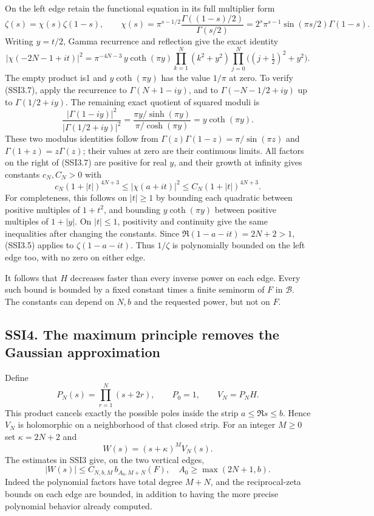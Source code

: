 On the left edge retain the functional equation in its full multiplier
form \[
\zeta(s)=\chi(s)\zeta(1-s),\qquad
\chi(s)=\pi^{s-1/2}\frac{\Gamma((1-s)/2)}{\Gamma(s/2)}
=2^s\pi^{s-1}\sin(\pi s/2)\Gamma(1-s).
\tag{SSI3.6}
\] Writing \(y=t/2\), Gamma recurrence and reflection give the exact
identity \[
|\chi(-2N-1+it)|^2=
\pi^{-4N-3}\,y\coth(\pi y)
 \prod_{k=1}^{N}(k^2+y^2)
 \prod_{j=0}^{N}\big((j+\tfrac12)^2+y^2\big).
\tag{SSI3.7}
\] The empty product is1 and \(y\coth(\pi y)\) has the value \(1/\pi\)
at zero. To verify (SSI3.7), apply the recurrence to \(\Gamma(N+1-iy)\),
and to \(\Gamma(-N-1/2+iy)\) up to \(\Gamma(1/2+iy)\). The remaining
exact quotient of squared moduli is \[
\frac{|\Gamma(1-iy)|^2}{|\Gamma(1/2+iy)|^2}
=\frac{\pi y/\sinh(\pi y)}{\pi/\cosh(\pi y)}
=y\coth(\pi y).
\tag{SSI3.8}
\] These two modulus identities follow from
\(\Gamma(z)\Gamma(1-z)=\pi/\sin(\pi z)\) and \(\Gamma(1+z)=z\Gamma(z)\);
their values at zero are their continuous limits. All factors on the
right of (SSI3.7) are positive for real \(y\), and their growth at
infinity gives constants \(c_N,C_N>0\) with \[
c_N(1+|t|)^{4N+3}\le |\chi(a+it)|^2
 \le C_N(1+|t|)^{4N+3}.
\tag{SSI3.9}
\] For completeness, this follows on \(|t|\ge1\) by bounding each
quadratic between positive multiples of \(1+t^2\), and bounding
\(y\coth(\pi y)\) between positive multiples of \(1+|y|\). On
\(|t|\le1\), positivity and continuity give the same inequalities after
changing the constants. Since \(\Re(1-a-it)=2N+2>1\), (SSI3.5) applies
to \(\zeta(1-a-it)\). Thus \(1/\zeta\) is polynomially bounded on the
left edge too, with no zero on either edge.

It follows that \(H\) decreases faster than every inverse power on each
edge. Every such bound is bounded by a fixed constant times a finite
seminorm of \(F\) in \(\mathcal B\). The constants can depend on \(N,b\)
and the requested power, but not on \(F\).

\subsection{SSI4. The maximum principle removes the Gaussian
approximation}\label{ssi4.-the-maximum-principle-removes-the-gaussian-approximation}

Define \[
P_N(s)=\prod_{r=1}^N(s+2r),\qquad P_0=1,\qquad V_N=P_NH.
\tag{SSI4.1}
\] This product cancels exactly the possible poles inside the strip
\(a\le\Re s\le b\). Hence \(V_N\) is holomorphic on a neighborhood of
that closed strip. For an integer \(M\ge0\) set \(\kappa=2N+2\) and \[
W(s)=(s+\kappa)^M V_N(s).
\tag{SSI4.2}
\] The estimates in SSI3 give, on the two vertical edges, \[
|W(s)|\le C_{N,b,M}\, b_{A_0,M+N}(F),
\quad A_0\ge\max(2N+1,b).
\tag{SSI4.3}
\] Indeed the polynomial factors have total degree \(M+N\), and the
reciprocal-zeta bounds on each edge are bounded, in addition to having
the more precise polynomial behavior already computed.

